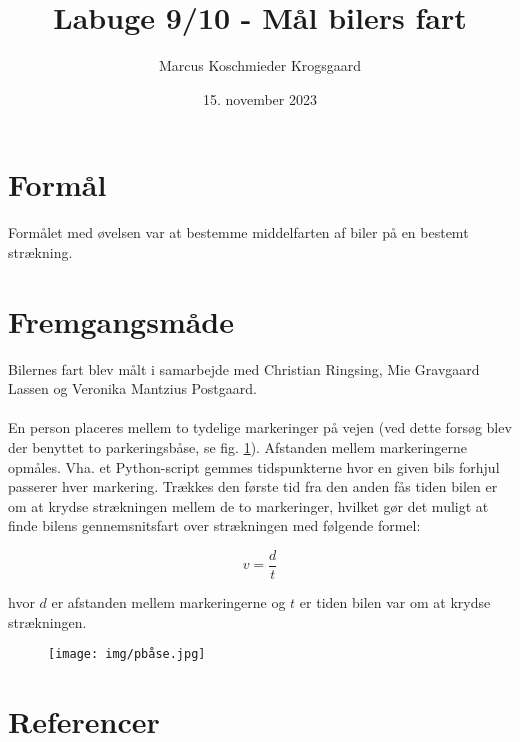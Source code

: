 \documentclass[hidelinks]{article}
\title{Labuge 9/10 - Mål bilers fart}
\author{Marcus Koschmieder Krogsgaard}
\date{15. november 2023}
\begin{document}
\maketitle

\section{Formål}
Formålet med øvelsen var at bestemme middelfarten af biler på en bestemt strækning.
\section{Fremgangsmåde}
Bilernes fart blev målt i samarbejde med Christian Ringsing, Mie Gravgaard Lassen og Veronika Mantzius Postgaard.\\
\\En person placeres mellem to tydelige markeringer på vejen (ved dette forsøg blev der benyttet to parkeringsbåse, se fig. \ref{fig:pplads}). Afstanden mellem markeringerne opmåles. Vha. et Python-script\cite{timescript} gemmes tidspunkterne hvor en given bils forhjul passerer hver markering. Trækkes den første tid fra den anden fås tiden bilen er om at krydse strækningen mellem de to markeringer, hvilket gør det muligt at finde bilens gennemsnitsfart over strækningen med følgende formel:

\[v = \frac{d}{t}\]

hvor $d$ er afstanden mellem markeringerne og $t$ er tiden bilen var om at krydse strækningen.

\begin{figure}[H]
    \centering
    \texttt{[image: img/pbåse.jpg]}
    \caption{}
    \label{fig:pplads}
\end{figure}


\section{Referencer}
\printbibliography[
heading=none
]
\end{document}
